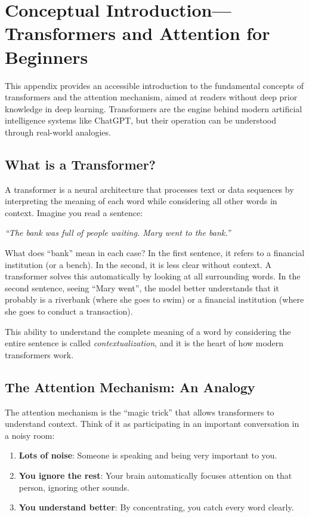 \section{Conceptual Introduction---Transformers and Attention for Beginners}
\label{sec:annex-tutorial}

This appendix provides an accessible introduction to the fundamental concepts of transformers and the attention mechanism, aimed at readers without deep prior knowledge in deep learning. Transformers are the engine behind modern artificial intelligence systems like ChatGPT, but their operation can be understood through real-world analogies.

\subsection{What is a Transformer?}

A transformer is a neural architecture that processes text or data sequences by interpreting the meaning of each word while considering all other words in context. Imagine you read a sentence:

\begin{center}
\textit{``The bank was full of people waiting. Mary went to the bank.''}
\end{center}

What does ``bank'' mean in each case? In the first sentence, it refers to a financial institution (or a bench). In the second, it is less clear without context. A transformer solves this automatically by looking at all surrounding words. In the second sentence, seeing ``Mary went'', the model better understands that it probably is a riverbank (where she goes to swim) or a financial institution (where she goes to conduct a transaction).

This ability to understand the complete meaning of a word by considering the entire sentence is called \emph{contextualization}, and it is the heart of how modern transformers work.

\subsection{The Attention Mechanism: An Analogy}

The attention mechanism is the ``magic trick'' that allows transformers to understand context. Think of it as participating in an important conversation in a noisy room:

\begin{enumerate}[leftmargin=*]
    \item \textbf{Lots of noise}: Someone is speaking and being very important to you.
    \item \textbf{You ignore the rest}: Your brain automatically focuses attention on that person, ignoring other sounds.
    \item \textbf{You understand better}: By concentrating, you catch every word clearly.
\end{enumerate}

